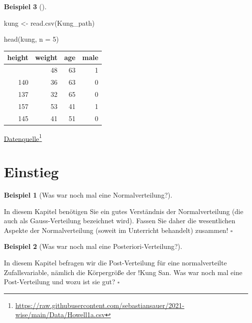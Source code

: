 \documentclass[
  ngerman,
  letterpaper,
  twoside,
  open=any]{scrbook}
\newenvironment{Shaded}{\begin{snugshade}}{\end{snugshade}}
\newcommand{\AttributeTok}[1]{\textcolor[rgb]{0.40,0.45,0.13}{#1}}
\newcommand{\DecValTok}[1]{\textcolor[rgb]{0.68,0.00,0.00}{#1}}
\newcommand{\FunctionTok}[1]{\textcolor[rgb]{0.28,0.35,0.67}{#1}}
\newcommand{\NormalTok}[1]{\textcolor[rgb]{0.00,0.23,0.31}{#1}}
\newcommand{\OtherTok}[1]{\textcolor[rgb]{0.00,0.23,0.31}{#1}}
\newcounter{none} %
\theoremstyle{definition}
\newtheorem{example}{Beispiel}[chapter]
\theoremstyle{plain}
\theoremstyle{definition}
\theoremstyle{definition}
\theoremstyle{remark}
\begin{document}
\begin{example}[]
\begin{Shaded}
\begin{Highlighting}[]
\NormalTok{kung }\OtherTok{\textless{}{-}} \FunctionTok{read.csv}\NormalTok{(Kung\_path) }

\FunctionTok{head}\NormalTok{(kung, }\AttributeTok{n =} \DecValTok{5}\NormalTok{)}
\end{Highlighting}
\end{Shaded}

{\def\LTcaptype{none} %
\begin{longtable}[]{@{}rrrr@{}}
\toprule\noalign{}
height & weight & age & male \\
\midrule\noalign{}
\endhead
\bottomrule\noalign{}
\endlastfoot
152 & 48 & 63 & 1 \\
140 & 36 & 63 & 0 \\
137 & 32 & 65 & 0 \\
157 & 53 & 41 & 1 \\
145 & 41 & 51 & 0 \\
\end{longtable}
}

\href{https://raw.githubusercontent.com/sebastiansauer/2021-wise/main/Data/Howell1a.csv}{Datenquelle}\footnote{\url{https://raw.githubusercontent.com/sebastiansauer/2021-wise/main/Data/Howell1a.csv}}

\section{Einstieg}\label{einstieg}

\begin{example}[Was war noch mal eine
Normalverteilung?]\protect\hypertarget{exm-gauss}{}\label{exm-gauss}

In diesem Kapitel benötigen Sie ein gutes Verständnis der
Normalverteilung (die auch als Gauss-Verteilung bezeichnet wird). Fassen
Sie daher die wesentlichen Aspekte der Normalverteilung (soweit im
Unterricht behandelt) zusammen! \(\square\)

\end{example}

\begin{example}[Was war noch mal eine
Posteriori-Verteilung?]\protect\hypertarget{exm-post-gauss}{}\label{exm-post-gauss}

In diesem Kapitel befragen wir die Post-Verteilung für eine
normalverteilte Zufallsvariable, nämlich die Körpergröße der !Kung San.
Was war noch mal eine Post-Verteilung und wozu ist sie gut? \(\square\)

\end{example}


\end{example}
\end{document}
